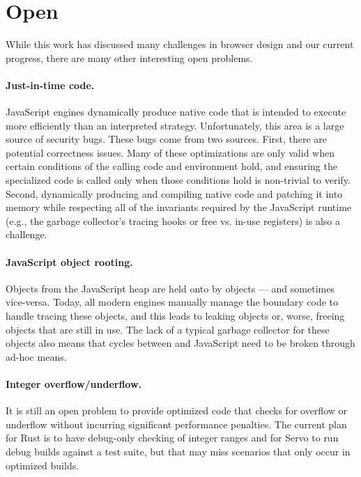 
\section{Open}
\label{sec:open}
While this work has discussed many challenges in browser design and our current progress,
there are many other interesting open problems.

\paragraph{Just-in-time code.} JavaScript engines dynamically produce native code that is
intended to execute more efficiently than an interpreted strategy.
Unfortunately, this area is a large source of security bugs.
These bugs come from two sources.
First, there are potential correctness issues.
Many of these optimizations are only valid when certain conditions of the calling
code and environment hold, and ensuring the specialized code is called only when those
conditions hold is non-trivial to verify.
Second, dynamically producing and compiling native code and patching it into memory
while respecting all of the invariants required by the JavaScript runtime (e.g., the
garbage collector's tracing hooks or free vs. in-use registers) is also a challenge.

\paragraph{JavaScript object rooting.} Objects from the JavaScript
heap  are held onto by \Cplusplus{} objects --- and sometimes vice-versa.
Today, all modern engines manually manage the boundary code to handle tracing
these objects, and this leads to leaking objects or, worse, freeing objects that
are still in use.
The lack of a typical garbage collector for these objects also means that cycles
between \Cplusplus{} and JavaScript need to be broken through ad-hoc means.

\paragraph{Integer overflow/underflow.} It is still an open problem
to provide optimized code that checks for overflow or underflow without
incurring significant performance penalties.
The current plan for Rust is to have debug-only checking of integer ranges
and for Servo to run debug builds against a test suite, but that may miss
scenarios that only occur in optimized builds.

